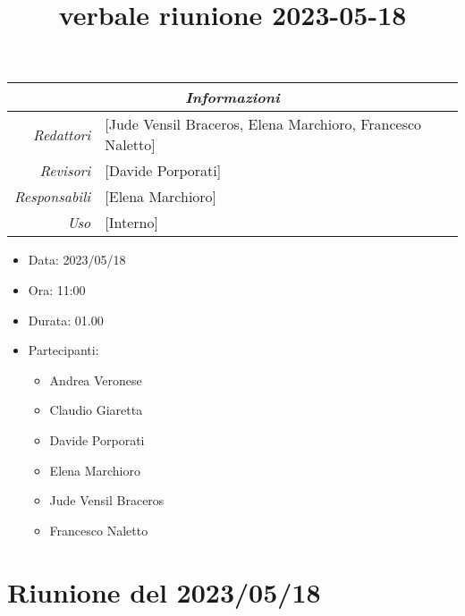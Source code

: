 \documentclass[12pt]{article}
\begin{document}
\graphicspath{ {../../templates/img} }

\title{verbale riunione 2023-05-18}

\firstPage
\maketitle

\begin{center}
\begin{tabular}{r | l}
    \multicolumn{2}{c}{\textit{Informazioni}}\\
    \hline
    
        \textit{Redattori} &
        [Jude Vensil Braceros, Elena Marchioro, Francesco Naletto]\makecell{}\\
    
        \textit{Revisori} &
        [Davide Porporati]\makecell{}\\
        \textit{Responsabili} &
        [Elena Marchioro]\makecell{}\\
            \textit{Uso} & 
            [Interno]\makecell{}\\
\end{tabular}
    \begin{itemize}
    \item[] Data: 2023/05/18
    \item[] Ora: 11:00
    \item[] Durata: 01.00
    \item[] Partecipanti:
    \begin{itemize}
    \item[] Andrea Veronese
    \item[] Claudio Giaretta
    \item[] Davide Porporati
    \item[] Elena Marchioro
    \item[] Jude Vensil Braceros
    \item[] Francesco Naletto
    \end{itemize}
    \end{itemize}
\end{center}


\tableofcontents
\printindex 
\section{Riunione del 2023/05/18}
\end{document}
